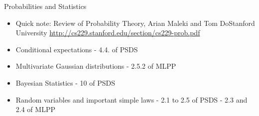\documentclass{article}
\newcommand{\nyuparagrah}[1]{\textcolor{nyupurple}{\large #1}}
\begin{document}
\nyuparagrah{Probabilities and Statistics}
    
\begin{itemize}
    \item Quick note: Review of Probability Theory, Arian Maleki and Tom DoStanford University \url{http://cs229.stanford.edu/section/cs229-prob.pdf}
    \item Conditional expectations - 4.4. of PSDS
    \item Multivariate Gaussian distributions - 2.5.2 of MLPP
    \item Bayesian Statistics - 10 of PSDS
    \item Random variables and important simple laws - 2.1 to 2.5 of PSDS - 2.3 and 2.4 of MLPP
\end{itemize}
\end{document}

